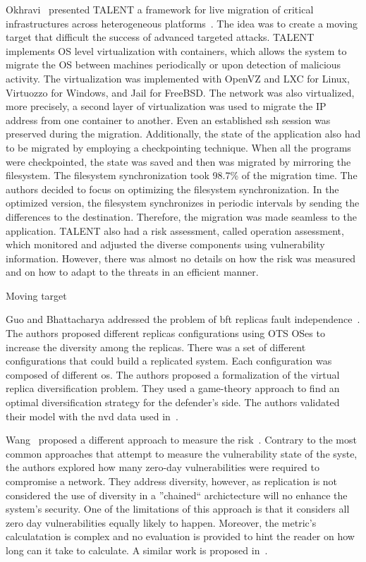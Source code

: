 Okhravi~\etal{} presented TALENT a framework for live migration of critical infrastructures across heterogeneous platforms~\cite{Okhravi:2014,Okhravi:2009}. 
The idea was to create a moving target that difficult the success of advanced targeted attacks. 
TALENT implements OS level virtualization with containers, which allows the system to migrate the OS between machines periodically or upon detection of malicious activity. 
The virtualization was implemented with OpenVZ and LXC for Linux, Virtuozzo for Windows, and Jail for FreeBSD. 
The network was also virtualized, more precisely, a second layer of virtualization was used to migrate the IP address from one container to another. 
Even an established ssh session was preserved during the migration. 
Additionally, the state of the application also had to be migrated by employing a checkpointing technique. 
When all the programs were checkpointed, the state was saved and then was migrated by mirroring the filesystem. 
The filesystem synchronization took 98.7\% of the migration time. 
The authors decided to focus on optimizing the filesystem synchronization. 
In the optimized version, the filesystem synchronizes in periodic intervals by sending the differences to the destination. 
Therefore, the migration was made seamless to the application. 
TALENT also had a risk assessment, called operation assessment, which monitored and adjusted the diverse components using vulnerability information. 
However, there was almost no details on how the risk was measured and on how to adapt to the threats in an efficient manner.

Moving target \cite{Hong:2015}


Guo and Bhattacharya addressed the problem of \gls{bft} replicas fault independence~\cite{Guo:2014}.
The authors proposed different replicas configurations using OTS OSes to increase the diversity among the replicas. 
There was a set of different configurations that could build a replicated system. 
Each configuration was composed of different \gls{os}. 
The authors proposed a formalization of the virtual replica diversification problem. 
They used a game-theory approach to find an optimal diversification strategy for the defender's side. 
The authors validated their model with the \gls{nvd} data used in~\cite{Garcia:2012}.

Wang~\etal{} proposed a different approach to measure the risk~\cite{Wang:2014}. 
Contrary to the most common approaches that attempt to measure the vulnerability state of the syste, the authors explored how many zero-day vulnerabilities were required to compromise a network. 
They address diversity, however, as replication is not considered the use of diversity in a ''chained`` archictecture will no enhance the system's security.
One of the limitations of this approach is that it considers all zero day vulnerabilities equally likely to happen.
Moreover, the metric's calculatation is complex and no evaluation is provided to hint the reader on how long can it take to calculate.
A similar work is proposed in~\cite{Bopche:2015}.

